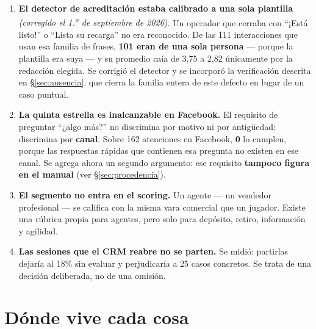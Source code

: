 \documentclass[11pt,a4paper]{article}
\begin{document}
\begin{enumerate}
\item \textbf{El detector de acreditación estaba calibrado a una sola plantilla}
\emph{(corregido el 1.\textsuperscript{o} de septiembre de 2026)}. Un operador que cerraba
con ``¡Está listo!'' o ``Lista su recarga'' no era reconocido. De las 111 interacciones que
usan esa familia de frases, \textbf{101 eran de una sola persona} --- porque la plantilla
era suya --- y su promedio caía de 3,75 a 2,82 únicamente por la redacción elegida. Se
corrigió el detector y se incorporó la verificación descrita en \S\ref{sec:ausencia}, que
cierra la familia entera de este defecto en lugar de un caso puntual.

\item \textbf{La quinta estrella es inalcanzable en Facebook.} El requisito de
preguntar ``¿algo más?'' no discrimina por motivo ni por antigüedad: discrimina por
\textbf{canal}. Sobre 162 atenciones en Facebook, \textbf{0} lo cumplen, porque las
respuestas rápidas que contienen esa pregunta no existen en ese canal. Se agrega ahora un
segundo argumento: ese requisito \textbf{tampoco figura en el manual}
(ver \S\ref{sec:procedencia}).

\item \textbf{El segmento no entra en el scoring.} Un agente --- un vendedor
profesional --- se califica con la misma vara comercial que un jugador. Existe una
rúbrica propia para agentes, pero solo para depósito, retiro, información y agilidad.

\item \textbf{Las sesiones que el CRM reabre no se parten.} Se midió: partirlas
dejaría al 18\% sin evaluar y perjudicaría a 25 casos concretos. Se trata de una decisión
deliberada, no de una omisión.
\end{enumerate}

\section{Dónde vive cada cosa}
\end{document}
